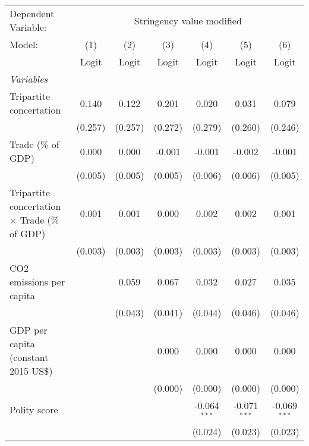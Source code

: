 
\begingroup
\centering
\begin{tabular}{lcccccc}
   \toprule
   Dependent Variable: & \multicolumn{6}{c}{Stringency value modified}\\
   Model:                                               & (1)     & (2)     & (3)     & (4)            & (5)            & (6)\\  
                                                        &  Logit  & Logit   & Logit   & Logit          & Logit          & Logit\\  
   \midrule
   \emph{Variables}\\
   Tripartite concertation                              & 0.140   & 0.122   & 0.201   & 0.020          & 0.031          & 0.079\\   
                                                        & (0.257) & (0.257) & (0.272) & (0.279)        & (0.260)        & (0.246)\\   
   Trade (\% of GDP)                                    & 0.000   & 0.000   & -0.001  & -0.001         & -0.002         & -0.001\\   
                                                        & (0.005) & (0.005) & (0.005) & (0.006)        & (0.006)        & (0.005)\\   
   Tripartite concertation $\times$ Trade (\% of GDP)   & 0.001   & 0.001   & 0.000   & 0.002          & 0.002          & 0.001\\   
                                                        & (0.003) & (0.003) & (0.003) & (0.003)        & (0.003)        & (0.003)\\   
   CO2 emissions per capita                             &         & 0.059   & 0.067   & 0.032          & 0.027          & 0.035\\   
                                                        &         & (0.043) & (0.041) & (0.044)        & (0.046)        & (0.046)\\   
   GDP per capita (constant 2015 US\$)                  &         &         & 0.000   & 0.000          & 0.000          & 0.000\\   
                                                        &         &         & (0.000) & (0.000)        & (0.000)        & (0.000)\\   
   Polity score                                         &         &         &         & -0.064$^{***}$ & -0.071$^{***}$ & -0.069$^{***}$\\   
                                                        &         &         &         & (0.024)        & (0.023)        & (0.023)\\   

\end{tabular}
